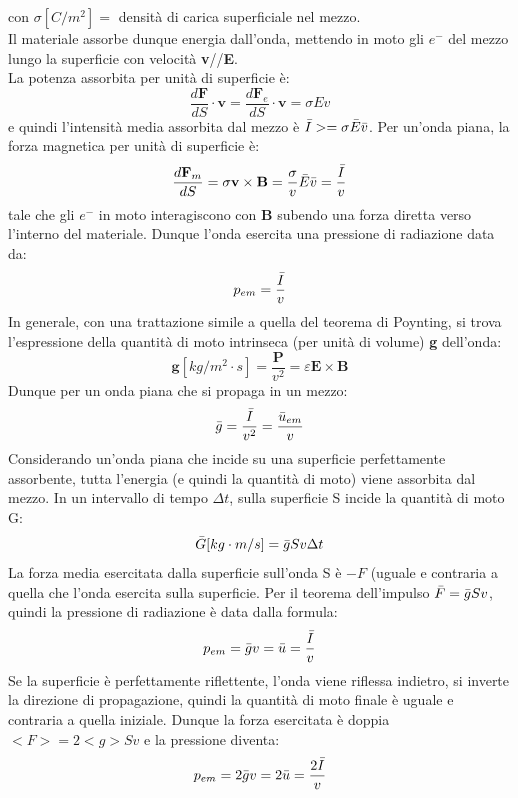 \documentclass{article}
\begin{document}
con $\sigma[C/m^2]=$ densità di carica superficiale nel mezzo.\\
Il materiale assorbe dunque energia dall'onda, mettendo in moto gli $e^-$ del mezzo lungo la superficie con velocità \textbf{v}//\textbf{E}.\\
La potenza assorbita per unità di superficie è:
\begin{equation}
\frac{d\textbf{F}}{dS}\cdot \textbf{v}
= \frac{d\textbf{F}_e}{dS}\cdot \textbf{v}
= \sigma Ev
\nonumber
\end{equation}
e quindi l'intensità media assorbita dal mezzo è $\Bar{I}>=\sigma \Bar{E}\Bar{v}$.
Per un’onda piana, la forza magnetica per unità di superficie è:
\begin{equation}
  \frac{d\textbf{F}_m}{dS}=\sigma \textbf{v}\times \textbf{B}=\frac{\sigma}{v}\Bar{E}\Bar{v}=\frac{\Bar{I}}{v}
  \nonumber
\end{equation}
tale che gli $e^-$ in moto interagiscono con \textbf{B} subendo una forza diretta verso l’interno del materiale. Dunque l’onda esercita una pressione di radiazione data da:
\begin{equation}
    p_{em}=\frac{\Bar{I}}{v}
    \nonumber
\end{equation}
In generale, con una trattazione simile a quella del teorema di Poynting, si trova l’espressione della quantità di moto intrinseca (per unità di volume) \textbf{g} dell’onda:
\begin{equation}
\textbf{g}[kg/m^2\cdot s]=\frac{\textbf{P}}{v^2}=\varepsilon \textbf{E} \times \textbf{B}
\end{equation}
Dunque per un onda piana che si propaga in un mezzo:
\begin{equation}
   \Bar{g}=\frac{\Bar{I}}{v^2}=\frac{\Bar{u}_{em}}{v} 
\end{equation}
Considerando un’onda piana che incide su una superficie
perfettamente assorbente, tutta l’energia (e quindi la quantità di moto) viene assorbita dal mezzo. In un intervallo di tempo $\Delta t$, sulla superficie S incide la quantità di moto G:
\begin{equation}
\Bar{G}[kg\cdot m/s]=\Bar{g}Sv\Delta t
\nonumber
\end{equation}
La forza media esercitata dalla superficie sull’onda S è $-F$ (uguale e contraria a quella che l’onda esercita sulla superficie. Per il teorema dell’impulso $\Bar{F}=\Bar{g}Sv$, quindi la pressione di radiazione è data dalla formula:
\begin{equation}
    p_{em}=\Bar{g}v
    =\Bar{u}
    =\frac{\Bar{I}}{v}
    \nonumber
\end{equation}
Se la superficie è perfettamente riflettente, l’onda viene riflessa indietro, si inverte la direzione di propagazione, quindi la quantità di moto finale è uguale e contraria a quella iniziale. Dunque la forza esercitata è doppia $<F>=2<g>Sv$ e la pressione diventa:
\begin{equation}
    p_{em}=2\Bar{g}v
    =2\Bar{u}=\frac{2\Bar{I}}{v}
    \nonumber
\end{equation}
\end{document}
